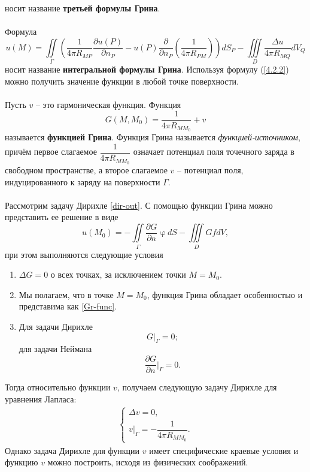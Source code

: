 \documentclass[a4paper, 12pt]{report}
\numberwithin{equation}{section}
\renewcommand{\varphi}{\upvarphi}
\newcommand{\pderiv}[2]{\dfrac{\partial #1}{\partial #2}}
\begin{document}
	носит название \textbf{третьей формулы Грина}.
	\\\\
	Формула
	\begin{equation}\label{4.2.2}
		u(M)=\iint\limits_\Gamma\left(\frac{1}{4\pi R_{MP}}\pderiv{u(P)}{n_P}-u(P)\pderiv{}{n_P}\left(\frac{1}{4\pi R_{PM}}\right)\right)dS_P -\iiint\limits_D\frac{\Delta u}{4\pi R_{MQ}}dV_Q
	\end{equation}
	носит название \textbf{интегральной формулы Грина}.
	Используя формулу (\ref{4.2.2}) можно получить значение функции в любой точке поверхности.
	\\\\
	Пусть $v$ -- это гармоническая функция. Функция
	\begin{equation}
		\label{Gr-func}
		G(M, M_0) = \dfrac{1}{4\pi R_{MM_0}} + v
	\end{equation}
	называется \textbf{функцией Грина}.
	Функция Грина называется \textit{функцией-источником}, причём первое слагаемое $\dfrac{1}{4\pi R_{MM_0}}$ означает потенциал поля точечного заряда в свободном пространстве, а второе слагаемое $v$ -- потенциал поля, индуцированного к заряду на поверхности $\Gamma$.\\\\
	Рассмотрим задачу Дирихле \eqref{dir-out}. С помощью функции Грина можно представить ее решение в виде
	\begin{equation}
		u(M_0)=-\iint\limits_\Gamma\pderiv{G}{n}\varphi dS-\iiint\limits_D GfdV,
	\end{equation}
	при этом выполняются следующие условия
	\begin{enumerate}
		\item $\Delta G = 0$ о всех точках, за исключением точки $M=M_0$.
		\item Мы полагаем, что в точке $M=M_0$, функция Грина обладает особенностью и представима как \eqref{Gr-func}.
		\item Для задачи Дирихле
		$$G\Bigr|_\Gamma=0;$$
		для задачи Неймана 
		$$\pderiv{G}{n}\Bigr|_\Gamma=0.$$
	\end{enumerate}
	Тогда относительно функции $v$, получаем следующую задачу Дирихле для уравнения Лапласа:
	\begin{gather*}
		\begin{cases}
			\Delta v = 0,\\
			v|_\Gamma=-\dfrac{1}{4\pi R_{MM_0}}.
		\end{cases}
	\end{gather*}
	Однако задача Дирихле для функции $v$ имеет специфические краевые условия и функцию $v$ можно построить, исходя из физических соображений.
	
\end{document}
